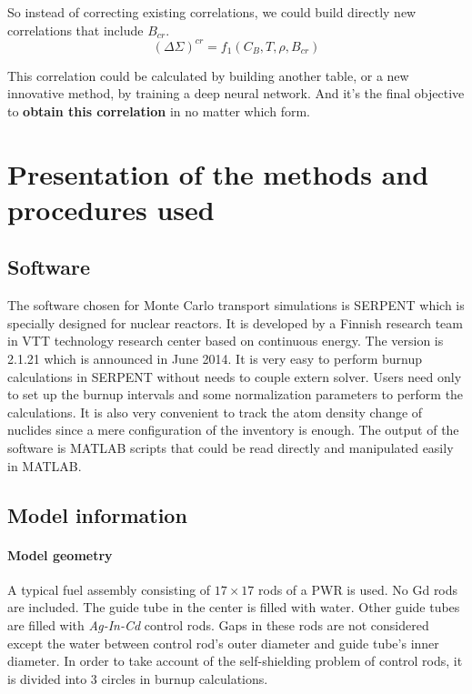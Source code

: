 So instead of correcting existing correlations, we could build directly new correlations that include $B_{cr}$.
\begin{equation}
    \label{eq:DeltaSigma}
    (\Delta\Sigma)^{cr} = f_1(C_B, T, \rho,B_{cr})
\end{equation}

This correlation could be calculated by building another table, or a new innovative method,
by training a deep neural network.
And it's the final objective to \textbf{obtain this correlation} in no matter which form.


\section{Presentation of the methods and procedures used}
\label{sec:methods}
\subsection{Software}
\label{sec:software}
The software chosen for Monte Carlo transport simulations is SERPENT which is specially designed for nuclear reactors.
It is developed by a Finnish research team in VTT technology research center based on continuous energy.
The version is 2.1.21 which is announced in June 2014.
It is very easy to perform burnup calculations in SERPENT without needs to couple extern solver.
Users need only to set up the burnup intervals and some normalization parameters to perform the calculations.
It is also very convenient to track the atom density change of nuclides since a mere configuration of the inventory is enough.
The output of the software is MATLAB scripts that could be read directly and manipulated easily in MATLAB.



\subsection{Model information}
\label{sec:model}
\paragraph{Model geometry}
\label{sec:geometry}

A typical fuel assembly consisting of $17\times17$ rods of a PWR is used.
No Gd rods are included. The guide tube in the center is filled with water.
Other guide tubes are filled with \textit{Ag-In-Cd} control rods.
Gaps in these rods are not considered except the water between control rod's
outer diameter and guide tube's inner diameter.
In order to take account of the self-shielding problem of control rods,
it is divided into 3 circles in burnup calculations.

